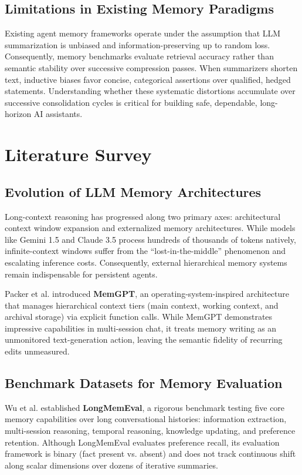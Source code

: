 \documentclass[12pt,a4paper]{report}
\begin{document}
\section{Limitations in Existing Memory Paradigms}
Existing agent memory frameworks operate under the assumption that LLM summarization is unbiased and information-preserving up to random loss. Consequently, memory benchmarks evaluate retrieval accuracy rather than semantic stability over successive compression passes. When summarizers shorten text, inductive biases favor concise, categorical assertions over qualified, hedged statements. Understanding whether these systematic distortions accumulate over successive consolidation cycles is critical for building safe, dependable, long-horizon AI assistants.

\chapter{Literature Survey}

\section{Evolution of LLM Memory Architectures}
Long-context reasoning has progressed along two primary axes: architectural context window expansion and externalized memory architectures. While models like Gemini 1.5 and Claude 3.5 process hundreds of thousands of tokens natively, infinite-context windows suffer from the ``lost-in-the-middle'' phenomenon and escalating inference costs. Consequently, external hierarchical memory systems remain indispensable for persistent agents.

Packer et al. \cite{packer2023memgpt} introduced \textbf{MemGPT}, an operating-system-inspired architecture that manages hierarchical context tiers (main context, working context, and archival storage) via explicit function calls. While MemGPT demonstrates impressive capabilities in multi-session chat, it treats memory writing as an unmonitored text-generation action, leaving the semantic fidelity of recurring edits unmeasured.

\section{Benchmark Datasets for Memory Evaluation}
Wu et al. \cite{wu2024longmemeval} established \textbf{LongMemEval}, a rigorous benchmark testing five core memory capabilities over long conversational histories: information extraction, multi-session reasoning, temporal reasoning, knowledge updating, and preference retention. Although LongMemEval evaluates preference recall, its evaluation framework is binary (fact present vs. absent) and does not track continuous shift along scalar dimensions over dozens of iterative summaries.
\end{document}
